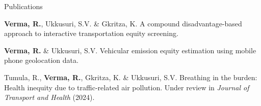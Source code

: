 \documentclass{CV} %
\begin{document}
\begin{rSection}{Publications}
\begin{etaremune}
        \item \textbf{Verma, R.}, Ukkusuri, S.V. \& Gkritza, K. A compound disadvantage-based approach to interactive transportation equity screening.
        
        \item \textbf{Verma, R.} \& Ukkusuri, S.V. Vehicular emission equity estimation using mobile phone geolocation data.
        
        \item Tumula, R., \textbf{Verma, R.}, Gkritza, K. \& Ukkusuri, S.V. Breathing in the burden: Health inequity due to traffic-related air pollution. Under review in \textit{Journal of Transport and Health} (2024).
    \end{etaremune}
\end{rSection}
\end{document}
